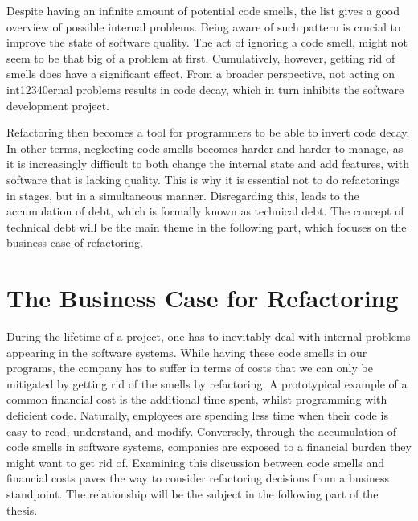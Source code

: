 Despite having an infinite amount of potential code smells,
	the list gives a good overview of possible internal problems.
Being aware of such pattern is crucial
	to improve the state of software quality.
The act of ignoring a code smell, 
	might not seem to be that big of a problem at first. 
Cumulatively, however, 
	getting rid of smells does have a significant effect.
From a broader perspective, not acting on int12340ernal problems results in
	code decay, which in turn inhibits the software development project. 

Refactoring then becomes a tool for programmers to be able to invert code decay.
In other terms, 
	neglecting code smells becomes harder and harder to manage, 
	as it is increasingly difficult to both change the internal state and 
	add features, with software that is lacking quality. 
This is why it is essential not to do refactorings in stages, 
	but in a simultaneous manner.
Disregarding this, 
	leads to the accumulation of debt, 
	which is formally known as technical debt. 
The concept of technical debt will be the main theme 
	in the following part, 
	which focuses on the business case of refactoring.

\chapter{The Business Case for Refactoring}
\label{sec:Business}

During the lifetime of a project, one has to inevitably deal with internal problems appearing in the software systems. While having these code smells in our programs, the company has to suffer in terms of costs that we can only be mitigated by getting rid of the smells by refactoring.  A prototypical example of a common financial cost is the additional time spent, whilst programming with deficient code. Naturally, employees are spending less time when their code is easy to read, understand, and modify. Conversely, through the accumulation of code smells in software systems, companies are exposed to a financial burden they might want to get rid of. Examining this discussion between code smells  and financial costs paves the way to consider refactoring decisions from a business standpoint. The relationship will be the subject in the following part of the thesis.  

